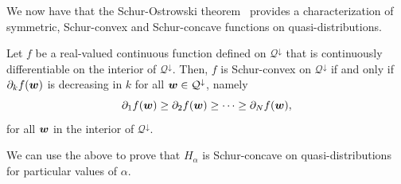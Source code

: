 \documentclass[pra,
aps,
twocolumn,
superscriptaddress,
groupedaddress,
nofootinbib,
reprint
]{revtex4-1}
\begin{document}
We now have that the Schur-Ostrowski theorem~\cite{cit:marshall} provides a characterization of symmetric, Schur-convex and Schur-concave functions on quasi-distributions.
\begin{lemma}
Let $f$ be a real-valued continuous function defined on $\mathcal{Q}^\downarrow$ that is continuously differentiable on the interior of $\mathcal{Q}^\downarrow$. 
Then, $f$ is Schur-convex on $\mathcal{Q}^\downarrow$ if and only if $\partial_k f(\boldsymbol{w})$ is decreasing in $k$ for all $\boldsymbol{w} \in \mathcal{Q}^\downarrow$, namely
\begin{equation}
\partial_1 f(\boldsymbol{w}) \ge \partial_2 f(\boldsymbol{w}) \ge \cdots \ge \partial_N f(\boldsymbol{w}),
\end{equation}
for all $\boldsymbol{w}$ in the interior of $\mathcal{Q}^\downarrow$.
\end{lemma}

We can use the above to prove that $H_\alpha$ is Schur-concave on quasi-distributions for particular values of $\alpha$.
\end{document}
